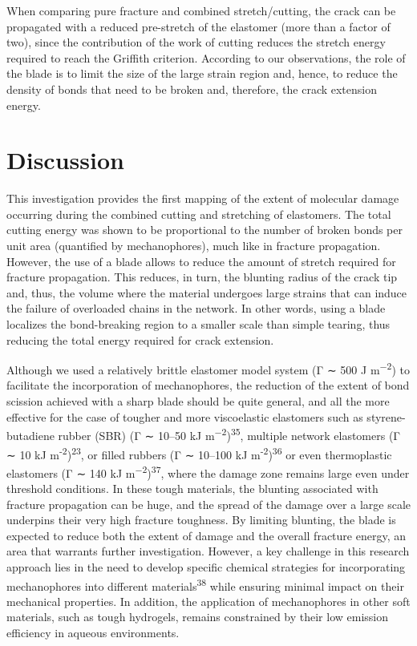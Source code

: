 \documentclass{article}
\begin{document}
When comparing pure fracture and combined stretch/cutting, the crack can be propagated with a reduced pre-stretch of the elastomer (more than a factor of two), since the contribution of the work of cutting reduces the stretch energy required to reach the Griffith criterion. According to our observations, the role of the blade is to limit the size of the large strain region and, hence, to reduce the density of bonds that need to be broken and, therefore, the crack extension energy.

\section*{Discussion}

This investigation provides the first mapping of the extent of molecular damage occurring during the combined cutting and stretching of elastomers. The total cutting energy was shown to be proportional to the number of broken bonds per unit area (quantified by mechanophores), much like in fracture propagation. However, the use of a blade allows to reduce the amount of stretch required for fracture propagation. This reduces, in turn, the blunting radius of the crack tip and, thus, the volume where the material undergoes large strains that can induce the failure of overloaded chains in the network. In other words, using a blade localizes the bond-breaking region to a smaller scale than simple tearing, thus reducing the total energy required for crack extension.

Although we used a relatively brittle elastomer model system (Γ ∼ 500 J m\textsuperscript{−2}) to facilitate the incorporation of mechanophores, the reduction of the extent of bond scission achieved with a sharp blade should be quite general, and all the more effective for the case of tougher and more viscoelastic elastomers such as styrene-butadiene rubber (SBR) (Γ ∼ 10–50 kJ m\textsuperscript{−2})\textsuperscript{35}, multiple network elastomers (Γ ∼ 10 kJ m\textsuperscript{-2})\textsuperscript{23}, or filled rubbers (Γ ∼ 10–100 kJ m\textsuperscript{-2})\textsuperscript{36} or even thermoplastic elastomers (Γ ∼ 140 kJ m\textsuperscript{−2})\textsuperscript{37}, where the damage zone remains large even under threshold conditions. In these tough materials, the blunting associated with fracture propagation can be huge, and the spread of the damage over a large scale underpins their very high fracture toughness. By limiting blunting, the blade is expected to reduce both the extent of damage and the overall fracture energy, an area that warrants further investigation. However, a key challenge in this research approach lies in the need to develop specific chemical strategies for incorporating mechanophores into different materials\textsuperscript{38} while ensuring minimal impact on their mechanical properties. In addition, the application of mechanophores in other soft materials, such as tough hydrogels, remains constrained by their low emission efficiency in aqueous environments.
\end{document}

